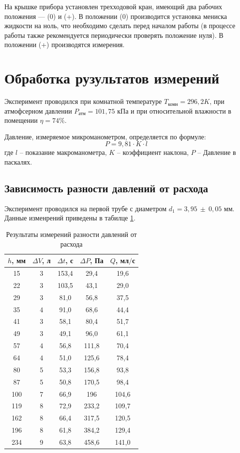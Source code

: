 \documentclass[a4paper,12pt]{article} %
\begin{document}
На крышке прибора установлен трехходовой кран, имеющий два рабочих
положения — (0) и (+). В положении (0) производится установка мениска жидкости на ноль, что необходимо сделать перед началом работы (в процессе работы также рекомендуется периодически проверять положение нуля). В положении (+) производятся измерения.
\newpage


\section{Обработка рузультатов измерений}

Эксперимент проводился при комнатной температуре $T_\text{комн}=296,2 K$, при атмофсерном давлении $P_\text{атм}=101,75$ кПа и при относительной влажности в помещении $\eta=74\%$.

Давление, измеряемое микроманометром, определяется по формуле:
\[
P=9,81 \cdot K \cdot l 
\]
где $l$ -- показание макроманометра, $K$ -- коэффициент наклона, $P$ -- Давление в паскалях.

\subsection{Зависимость разности давлений от расхода}
Эксперимент проводился на первой трубе с диаметром $d_1=3,95\ \pm\ 0,05$ мм. Данные изменрений приведены в табилце \ref{tab:q(p)}.

\begin{table}[H]
    \centering
    \begin{tabular}{|c|c|c|c|c|}
        \hline $h$, мм & $\Delta V$, л & $\Delta t$, с & $\Delta P$, Па & $Q$, мл$/$с \\
        \hline 15 & 3 & 153,4 & 29,4 & 19,6 \\
        \hline 22 & 3 & 103,5 & 43,1 & 29,0 \\
        \hline 29 & 3 & 81,0 & 56,8 & 37,5 \\
        \hline 35 & 4 & 91,0 & 68,6 & 44,4 \\
        \hline 41 & 3 & 58,1 & 80,4 & 51,7 \\
        \hline 49 & 3 & 49,1 & 96,0 & 61,1 \\
        \hline 57 & 4 & 56,8 & 111,8 & 70,4 \\
        \hline 64 & 4 & 51,0 & 125,6 & 78,4 \\ \hline
        \hline 80 & 5 & 53,3 & 156,8 & 93,8 \\
        \hline 87 & 5 & 50,8 & 170,5 & 98,4 \\
        \hline 100 & 7 & 66,9 & 196 & 104,6 \\
        \hline 119 & 8 & 72,9 & 233,2 & 109,7 \\
        \hline 162 & 8 & 66,4 & 317,5 & 120,5 \\
        \hline 196 & 8 & 61,8 & 384,2 & 129,4 \\
        \hline 234 & 9 & 63,8 & 458,6 & 141,0\\ \hline
    \end{tabular}
    \caption{Результаты измерений разности давлений от расхода}
    \label{tab:q(p)}
\end{table}
\end{document}
